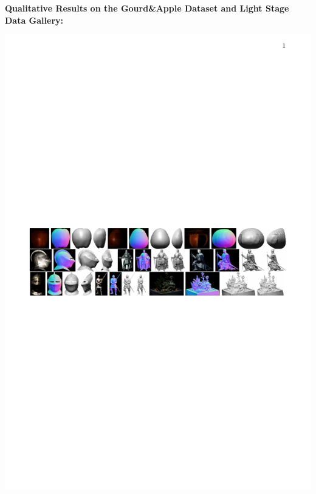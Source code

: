 \documentclass[a0paper,landscape]{baposter}
\begin{document}
\begin{poster}
{        \vspace{0.8em}
        \textbf{\color{blue}Qualitative Results on the Gourd\&Apple Dataset and Light Stage Data Gallery:}
        \vspace{-0.8em}
        \begin{center}
            \includegraphics[width=1\textwidth]{images/gourd_stage}
        \end{center}

}
\end{poster}
\end{document}
